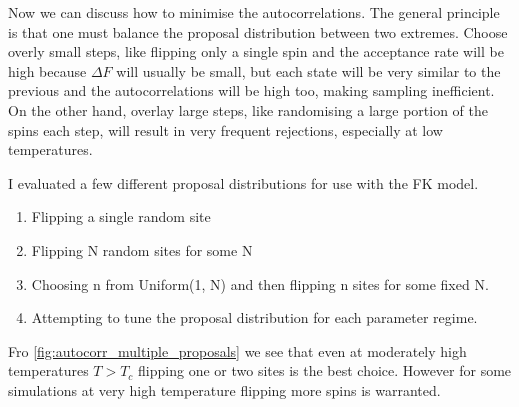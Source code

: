 Now we can discuss how to minimise the autocorrelations. The general principle is that one must balance the proposal distribution between two extremes. Choose overly small steps, like flipping only a single spin and the acceptance rate will be high because \(\Delta F\) will usually be small, but each state will be very similar to the previous and the autocorrelations will be high too, making sampling inefficient. On the other hand, overlay large steps, like randomising a large portion of the spins each step, will result in very frequent rejections, especially at low temperatures.

I evaluated a few different proposal distributions for use with the FK model.

\begin{enumerate}
\def\labelenumi{\arabic{enumi}.}
\tightlist
\item
  Flipping a single random site
\item
  Flipping N random sites for some N
\item
  Choosing n from Uniform(1, N) and then flipping n sites for some fixed N.
\item
  Attempting to tune the proposal distribution for each parameter regime.
\end{enumerate}

Fro \cref{fig:autocorr_multiple_proposals} we see that even at moderately high temperatures \(T > T_c\) flipping one or two sites is the best choice. However for some simulations at very high temperature flipping more spins is warranted.

